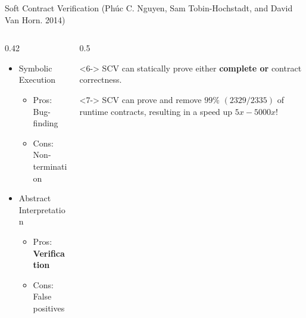 \begin{frame}{Soft Contract Verification {\footnotesize (Phúc C. Nguyen, Sam Tobin-Hochstadt, and David Van Horn. 2014)}}
  \Large
  \begin{center}
  \begin{columns}[T] %

    \begin{column}{0.42\textwidth}
      \begin{itemize}
        \item Symbolic Execution
          \begin{itemize}
            \normalsize
            \item<2-> Pros: Bug-finding
            \item<3-> Cons: Non-termination
          \end{itemize}
          \vspace{2em}
        \item Abstract Interpretation
          \begin{itemize}
            \normalsize
            \item<4-> Pros: \textbf{Verification}
            \item<5-> Cons: False positives
          \end{itemize}
      \end{itemize}
    \end{column}

    \begin{column}{0.5\textwidth}
      \begin{block}<6->{}
        \normalsize
        SCV can statically prove either \textbf{complete or } contract correctness.
      \end{block}
      \vspace{0.5em}
      \begin{block}<7->{}
        \normalsize
        SCV can prove and remove $99\%$ $(2329/2335)$ of runtime contracts, resulting in a speed up $5x - 5000x$!
      \end{block}
    \end{column}

  \end{columns}
  \end{center}
\end{frame}


